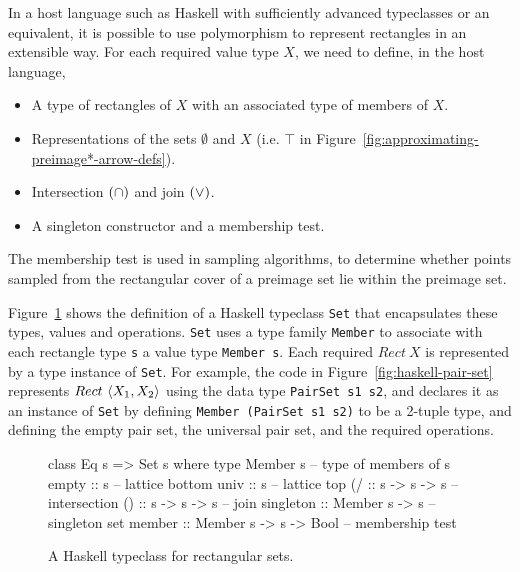 In a host language such as Haskell with sufficiently advanced typeclasses or an equivalent, it is possible to use polymorphism to represent rectangles in an extensible way.
For each required value type $X$, we need to define, in the host language,
\begin{itemize}
	\item A type of rectangles of $X$ with an associated type of members of $X$.
	\item Representations of the sets $\emptyset$ and $X$ (i.e. $\top$ in Figure~\ref{fig:approximating-preimage*-arrow-defs}).
	\item Intersection $(\cap)$ and join $(\vee)$.
	\item A singleton constructor and a membership test.
\end{itemize}
The membership test is used in sampling algorithms, to determine whether points sampled from the rectangular cover of a preimage set lie within the preimage set.

Figure~\ref{fig:haskell-sets} shows the definition of a Haskell typeclass \texttt{Set} that encapsulates these types, values and operations.
\texttt{Set} uses a type family \texttt{Member} to associate with each rectangle type \texttt{s} a value type \texttt{Member~s}.
Each required $Rect~X$ is represented by a type instance of \texttt{Set}.
For example, the code in Figure~\ref{fig:haskell-pair-set} represents $Rect~\langle{X_1,X_2}\rangle$ using the data type \texttt{PairSet~s1~s2}, and declares it as an instance of \texttt{Set} by defining \texttt{Member~(PairSet~s1~s2)} to be a 2-tuple type, and defining the empty pair set, the universal pair set, and the required operations.

\begin{figure}[tb!]\centering
\begin{varwidth}{5.25in}
\begin{haskellcode}
class Eq s => Set s where
  type Member s                      -- type of members of s
  empty :: s                         -- lattice bottom
  univ  :: s                         -- lattice top
  (/\) :: s -> s -> s                -- intersection
  (\/) :: s -> s -> s                -- join
  singleton :: Member s -> s         -- singleton set
  member :: Member s -> s -> Bool    -- membership test
\end{haskellcode}
\end{varwidth}
\bottomhrule
\caption[Haskell typeclass for rectangular sets]{A Haskell typeclass for rectangular sets.}
\label{fig:haskell-sets}
\end{figure}

